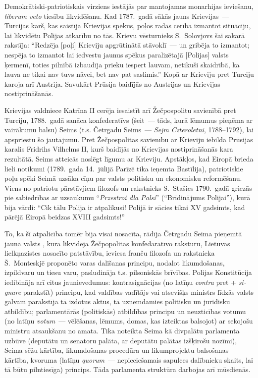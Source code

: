 \documentclass[twoside,a5paper,12pt,fleqn,openany]{extbook}
\newcommand{\pltxti}[1]{\textit{\textpolish{#1}}}
\newcommand{\latxti}[1]{\textit{\textlatin{#1}}}
\begin{document}
Demokrātiski-patriotiskais virziens iestājās par mantojamas monarhijas ieviešanu, \latxti{liberum veto} tiesību likvidēšanu. Kad 1787.~gadā sākās jauns Krievijas~--- Turcijas karš, kas saistīja Krievijas spēkus, poļos radās cerība izmantot situāciju, lai likvidētu Polijas atkarību no tās. Krievu vēsturnieks S.~Solovjovs šai sakarā rakstīja: ``Redzēja [poļi] Krieviju apgrūtinātā stāvoklī~--- un gribēja to izmantot; nespēja to izmantot lai iedvestu jaunus spēkus paralizētajā [Polijas] valsts ķermenī, toties pilnībā izbaudīja prieku iespert lauvam, netikuši skaidrībā, ka lauva ne tikai nav tuvs nāvei, bet nav pat saslimis.'' Kopā ar Krieviju pret Turciju karoja arī Austrija. Savukārt Prūsija baidījās no Austrijas un Krievijas nostiprināšanās.

Krievijas valdniece Katrīna II cerēja iesaistīt arī Žečpospolitu savienībā pret Turciju, 1788.~gadā sanāca konfederatīvs (šeit~--- tāds, kurā lēmumus pieņēma ar vairākumu balsu) Seims (t.s. Četrgadu Seims~--- \pltxti{Sejm Czteroletni}, 1788--1792), lai apspriestu šo jautājumu. Pret Žečpospolitas savienību ar Krieviju iebilda Prūsijas karalis Fridrihs Vilhelms II, kurš baidījās no Krievijas nostiprināšanās kara rezultātā. Seims atteicās noslēgt līgumu ar Krieviju. Apstākļos, kad Eiropā brieda lieli notikumi (1789.~gada 14.~jūlijā Parīzē tika ieņemta Bastīlija), patriotiskie poļu spēki Seimā uzsāka cīņu par valsts politisku un ekonomisku reformēšanu. Viens no patriotu pārstāvjiem filozofs un rakstnieks S.~Stašics 1790.~gadā griezās pie sabiedrības ar uzsaukumu ``\pltxti{Przestroi dla Polsi}'' (``Brīdinājums Polijai''), kurā bija vārdi: ``Cik tālu Polija ir atpalikusi! Polijā ir sācies tikai XV gadsimts, kad pārējā Eiropā beidzas XVIII gadsimts!''

To, ka šī atpalicība tomēr bija visai nosacīta, rādīja  Četrgadu Seima pieņemtā jaunā valsts , kura likvidēja Žečpopolitas konfedaratīvo raksturu, Lietuvas lielkņazistes nosacīto patstāvību, ieviesa franču filozofa un rakstnieka Š.~Monteskjē proponēto varas dalīšanas principu, nodalot likumdošanas, izpildvaru un tiesu varu, pasludināja t.s. pilsoniskās brīvības. Polijas Konstitūcija iedibināja arī citus jaunievedumus: kontrasignācijas (no latīņu \latxti{contra} pret + \latxti{signare} parakstīt) principu, kad valdības vadītājs vai atsevišķs ministrs līdzās valsts galvam parakstīja tā izdotus aktus, tā uzņemdamies politisku un juridisku atbildību; parlamentārās (politiskās) atbildības principu un neuzticības votumu (no latīņu \latxti{votum}~--- vēlēšanas, lēmums, domas, kas izteiktas balsojot) ar sekojošu ministru atsaukšanu no amata. Tika noteikta Seima kā divpalātu parlamenta uzbūve (deputātu un senatoru palāta, ar deputātu palātas izšķirošu nozīmi), Seima sēžu kārtība, likumdošanas procedūra un likumprojektu balsošanas kārtība, kvoruma (latīņu \latxti{quorum}~--- nepieciešamais sapulces dalībnieku skaits, lai tā būtu pilntiesīga) princips. Tāda parlamenta struktūra darbojas arī mūsdienās.
\end{document}
